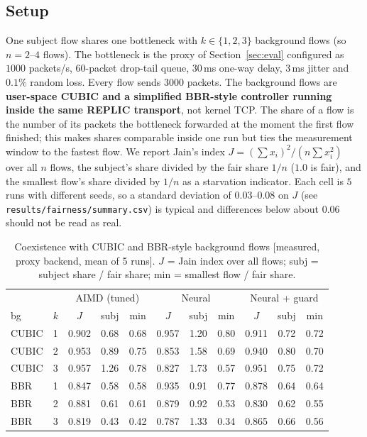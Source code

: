 \subsection{Setup}
One subject flow shares one bottleneck with $k\in\{1,2,3\}$ background flows (so $n=2$--$4$ flows). The bottleneck is the proxy of Section~\ref{sec:eval} configured as $1000$ packets/s, $60$-packet drop-tail queue, $30$\,ms one-way delay, $3$\,ms jitter and $0.1\%$ random loss. Every flow sends $3000$ packets. The background flows are \textbf{user-space CUBIC and a simplified BBR-style controller running inside the same REPLIC transport}, not kernel TCP. The share of a flow is the number of its packets the bottleneck forwarded at the moment the first flow finished; this makes shares comparable inside one run but ties the measurement window to the fastest flow. We report Jain's index $J=(\sum x_i)^2/(n\sum x_i^2)$ over all $n$ flows, the subject's share divided by the fair share $1/n$ ($1.0$ is fair), and the smallest flow's share divided by $1/n$ as a starvation indicator. Each cell is $5$ runs with different seeds, so a standard deviation of $0.03$--$0.08$ on $J$ (see \texttt{results/fairness/summary.csv}) is typical and differences below about $0.06$ should not be read as real.

\begin{table}[t]
\centering\small
\caption{Coexistence with CUBIC and BBR-style background flows [measured, proxy backend, mean of 5 runs]. $J$ = Jain index over all flows; subj = subject share / fair share; min = smallest flow / fair share.}
\label{tab:fair}
\begin{tabular}{llccc|ccc|ccc}
\toprule
 & & \multicolumn{3}{c|}{AIMD (tuned)} & \multicolumn{3}{c|}{Neural} & \multicolumn{3}{c}{Neural + guard}\\
bg & $k$ & $J$ & subj & min & $J$ & subj & min & $J$ & subj & min \\
\midrule
CUBIC & 1 & 0.902 & 0.68 & 0.68 & 0.957 & 1.20 & 0.80 & 0.911 & 0.72 & 0.72 \\
CUBIC & 2 & 0.953 & 0.89 & 0.75 & 0.853 & 1.58 & 0.69 & 0.940 & 0.80 & 0.70 \\
CUBIC & 3 & 0.957 & 1.26 & 0.78 & 0.827 & 1.73 & 0.57 & 0.951 & 0.75 & 0.72 \\
BBR & 1 & 0.847 & 0.58 & 0.58 & 0.935 & 0.91 & 0.77 & 0.878 & 0.64 & 0.64 \\
BBR & 2 & 0.881 & 0.61 & 0.61 & 0.879 & 0.92 & 0.53 & 0.830 & 0.62 & 0.55 \\
BBR & 3 & 0.819 & 0.43 & 0.42 & 0.787 & 1.33 & 0.34 & 0.865 & 0.66 & 0.56 \\
\bottomrule
\end{tabular}
\end{table}

